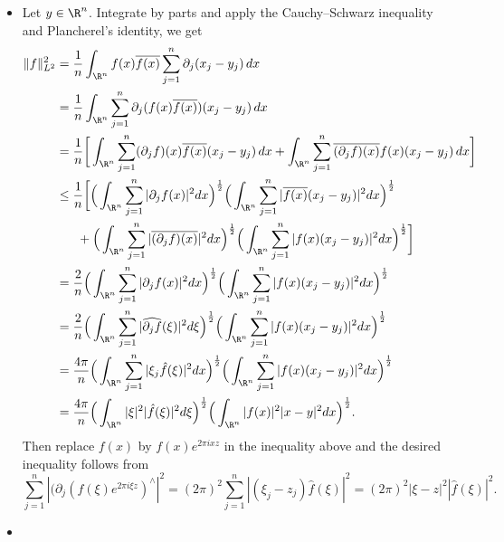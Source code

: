 \begin{itemize}
\item[2.2.13]

Let $y\in\R^n$. Integrate by parts and apply the Cauchy--Schwarz inequality 
and Plancherel's identity, we get
\begin{align*}
    \|f\|_{L^2}^2
    &=\frac{1}{n}\int_{\R^n}f(x)\overline{f(x)}\sum_{j=1}^n \partial_j(x_j-y_j)\,dx\\
    &=\frac{1}{n}\int_{\R^n}\sum_{j=1}^n\partial_j(f(x)\overline{f(x)}) (x_j-y_j)\,dx\\
    &=\frac{1}{n}\bigg[\int_{\R^n}\sum_{j=1}^n(\partial_jf)(x)\overline{f(x)}(x_j-y_j)\,dx
    +\int_{\R^n}\sum_{j=1}^n\overline{(\partial_jf)(x)}f(x)(x_j-y_j)\,dx\bigg]\\
    &\leq\frac{1}{n}\bigg[\Big(\int_{\R^n}\sum_{j=1}^n|\partial_jf(x)|^2dx\Big)^{\frac{1}{2}}\Big(\int_{\R^n}\sum_{j=1}^n|\overline{f(x)}(x_j-y_j)|^2dx\Big)^\frac{1}{2}\\
    &\ \ \ \ \ +\Big(\int_{\R^n}\sum_{j=1}^n|\overline{(\partial_jf)(x)}|^2dx\Big)^\frac{1}{2}\Big(\int_{\R^n}\sum_{j=1}^{n}|f(x)(x_j-y_j)|^2dx\Big)^\frac{1}{2}\bigg]\\
    &=\frac{2}{n}\Big(\int_{\R^n}\sum_{j=1}^n|\partial_jf(x)|^2dx\Big)^{\frac{1}{2}}\Big(\int_{\R^n}\sum_{j=1}^n|f(x)(x_j-y_j)|^2dx\Big)^\frac{1}{2}\\
    &=\frac{2}{n}\Big(\int_{\R^n}\sum_{j=1}^n|\widehat{\partial_jf}(\xi)|^2d\xi\Big)^{\frac{1}{2}}\Big(\int_{\R^n}\sum_{j=1}^n|f(x)(x_j-y_j)|^2dx\Big)^\frac{1}{2}\\
    &=\frac{4\pi}{n}\Big(\int_{\R^n}\sum_{j=1}^n|\xi_j\hat{f}(\xi)|^2dx\Big)^{\frac{1}{2}}\Big(\int_{\R^n}\sum_{j=1}^n|f(x)(x_j-y_j)|^2dx\Big)^\frac{1}{2}\\
    &=\frac{4\pi}{n}\Big(\int_{\R^n}|\xi|^2|\hat{f}(\xi)|^2d\xi\Big)^{\frac{1}{2}}\Big(\int_{\R^n}|f(x)|^2|x-y|^2dx\Big)^\frac{1}{2}.
\end{align*}
Then replace $f(x)$ by $f(x)e^{2\pi ixz}$ in the inequality above and the desired inequality follows from
$$\sum_{j=1}^n|(\partial_j(f(\xi) e^{2\pi i\xi z})^\wedge|^2=(2\pi)^2\sum_{j=1}^n|(\xi_j-z_j)\hat{f}(\xi)|^2=(2\pi)^2|\xi-z|^2|\hat{f}(\xi)|^2.$$

\item[2.2.14]


\end{itemize}
